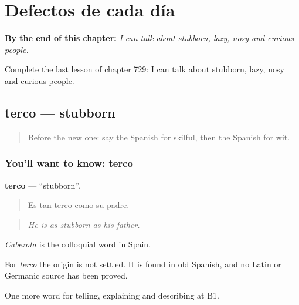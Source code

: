 
\chapter{Defectos de cada día}
\label{ch:es-defectos-de-cada-dia}

\begin{chapteropening}
\textbf{By the end of this chapter:} \emph{I can talk about stubborn, lazy, nosy and curious people.}

Complete the last lesson of chapter 729: I can talk about stubborn, lazy, nosy and curious people.
\end{chapteropening}

\section[terco]{terco — stubborn}

\label{lesson:ES-C729-terco}



\begin{quote}
Before the new one: say the Spanish for skilful, then the Spanish for wit.
\end{quote}

\subsection*{You'll want to know: terco}
\textbf{terco} — \textquotedblleft{}stubborn\textquotedblright{}.

\begin{quote}
Es tan terco como su padre.
\end{quote}

\begin{quote}
\emph{He is as stubborn as his father.}
\end{quote}

\emph{Cabezota} is the colloquial word in Spain.

\begin{cousinweb}
For \emph{terco} the origin is not settled. It is found in old Spanish, and no Latin or Germanic source has been proved.
\end{cousinweb}

\begin{grammarlens}[title={What you've built}]
One more word for telling, explaining and describing at B1.
\end{grammarlens}


